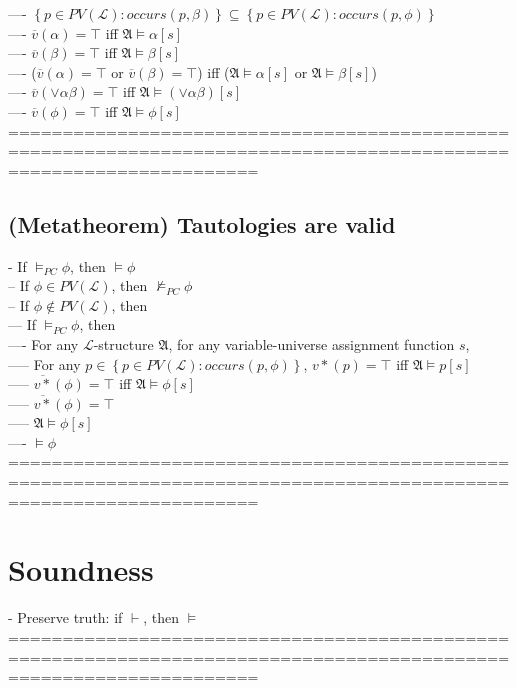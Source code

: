 \documentclass{book}
\newcommand{\inot}{\not}
\newcommand{\occurs}[2]{occurs(#1, #2)}
\newcommand{\extend}[1]{\overline{#1}}
\newcommand{\set}[1]{\left\{ #1 \right\}}
\begin{document}
				---- $\set{p \in PV(\mathcal{L}): \occurs{p}{\beta}} \subseteq \set{p \in PV(\mathcal{L}): \occurs{p}{\phi}}$ \\
				---- $\extend{v}(\alpha) = \top$ iff $\mathfrak{A} \vDash \alpha[s]$ \\
				---- $\extend{v}(\beta) = \top$ iff $\mathfrak{A} \vDash \beta[s]$ \\
				---- ($\extend{v}(\alpha) = \top$ or $\extend{v}(\beta) = \top$) iff ($\mathfrak{A} \vDash \alpha[s]$ or $\mathfrak{A} \vDash \beta[s]$) \\
				---- $\extend{v}(\lor \alpha \beta) = \top$ iff $\mathfrak{A} \vDash (\lor \alpha \beta)[s]$ \\
				---- $\extend{v}(\phi) = \top$ iff $\mathfrak{A} \vDash \phi[s]$ \\
	===================================================================================================================
\subsection{(Metatheorem) Tautologies are valid} %
	- If $\vDash_{PC} \phi$, then $\vDash \phi$ \\
		-- If $\phi \in PV(\mathcal{L})$, then $\inot \vDash_{PC} \phi$ \\
		-- If $\phi \inot \in PV(\mathcal{L})$, then \\
			--- If $\vDash_{PC} \phi$, then \\
				---- For any $\mathcal{L}$-structure $\mathfrak{A}$, for any variable-universe assignment function $s$, \\
					----- For any $p \in \set{p \in PV(\mathcal{L}): \occurs{p}{\phi}}$, $v*(p) = \top$ iff $\mathfrak{A} \vDash p[s]$ \\
					----- $\extend{v*}(\phi) = \top$ iff $\mathfrak{A} \vDash \phi[s]$ \\
					----- $\extend{v*}(\phi) = \top$ \\
					----- $\mathfrak{A} \vDash \phi[s]$ \\
				---- $\vDash \phi$ \\
	===================================================================================================================

\section{Soundness}
	- Preserve truth: if $\vdash$, then $\vDash$ \\
	===================================================================================================================
\end{document}
